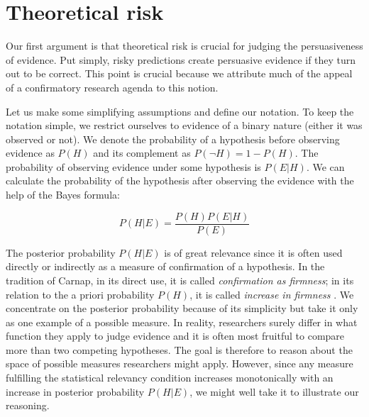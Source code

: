 \documentclass[jou,a4paper]{apa7}
\begin{document}
\section{Theoretical risk}

Our first argument is that theoretical risk is crucial for judging the persuasiveness of evidence.
Put simply, risky predictions create persuasive evidence if they turn out to be correct.
This point is crucial because we attribute much of the appeal of a confirmatory research agenda to this notion.\par

Let us make some simplifying assumptions and define our notation.
To keep the notation simple, we restrict ourselves to evidence of a binary nature (either it was observed or not).
We denote the probability of a hypothesis before observing evidence as $P(H)$ and its complement as $P(\neg{}H) = 1 - P(H)$.
The probability of observing evidence under some hypothesis is $P(E|H)$.
We can calculate the probability of the hypothesis after observing the evidence with the help of the Bayes formula:

\begin{equation}
P(H|E) = \frac{P(H)P(E|H)}{P(E)} \label{eq:bayes}
\end{equation}

The posterior probability $P(H|E)$ is of great relevance since it is often used directly or indirectly as a measure of confirmation of a hypothesis.
In the tradition of Carnap, in its direct use, it is called \textit{confirmation as firmness}; in its relation to the a priori probability $P(H)$, it is called \textit{increase in firmness} \parencite[][, preface to the 1962 edition]{carnapLogicalFoundationsProbability1950}.
We concentrate on the posterior probability because of its simplicity but take it only as one example of a possible measure.
In reality, researchers surely differ in what function they apply to judge evidence and it is often most fruitful to compare more than two competing hypotheses.
The goal is therefore to reason about the space of possible measures researchers might apply.
However, since any measure fulfilling the statistical relevancy condition increases monotonically with an increase in posterior probability $P(H|E)$, we might well take it to illustrate our reasoning.
\end{document}
